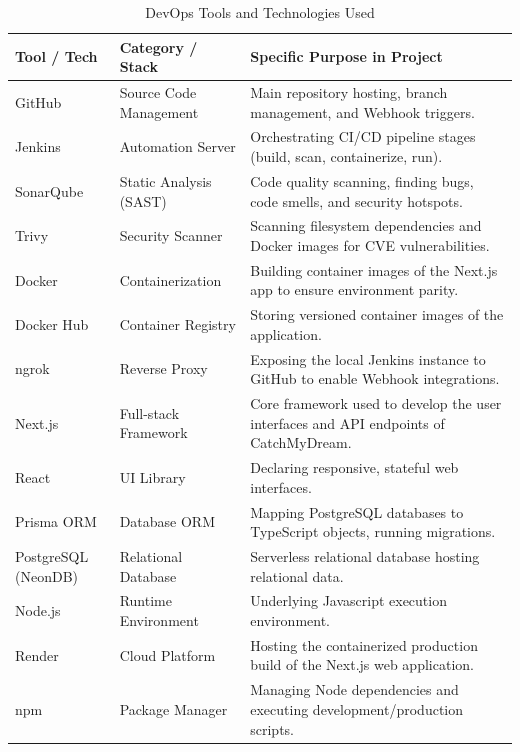 \documentclass[12pt,a4paper]{article}
\begin{document}
\begin{table}[H]
\centering
\caption{DevOps Tools and Technologies Used}
\label{tab:tools}
\vspace{0.2cm}
\begin{singlespace}
\small
\renewcommand{\arraystretch}{1.15} %
\begin{tabularx}{\textwidth}{p{3.2cm} >{\raggedright\arraybackslash}X >{\raggedright\arraybackslash}X}
\toprule
\rowcolor{gray!20} %
\textbf{Tool / Tech} & \textbf{Category / Stack} & \textbf{Specific Purpose in Project} \\
\midrule
GitHub & Source Code Management & Main repository hosting, branch management, and Webhook triggers. \\
Jenkins & Automation Server & Orchestrating CI/CD pipeline stages (build, scan, containerize, run). \\
SonarQube & Static Analysis (SAST) & Code quality scanning, finding bugs, code smells, and security hotspots. \\
Trivy & Security Scanner & Scanning filesystem dependencies and Docker images for CVE vulnerabilities. \\
Docker & Containerization & Building container images of the Next.js app to ensure environment parity. \\
Docker Hub & Container Registry & Storing versioned container images of the application. \\
ngrok & Reverse Proxy & Exposing the local Jenkins instance to GitHub to enable Webhook integrations. \\
Next.js & Full-stack Framework & Core framework used to develop the user interfaces and API endpoints of CatchMyDream. \\
React & UI Library & Declaring responsive, stateful web interfaces. \\
Prisma ORM & Database ORM & Mapping PostgreSQL databases to TypeScript objects, running migrations. \\
PostgreSQL (NeonDB) & Relational Database & Serverless relational database hosting relational data. \\
Node.js & Runtime Environment & Underlying Javascript execution environment. \\
Render & Cloud Platform & Hosting the containerized production build of the Next.js web application. \\
npm & Package Manager & Managing Node dependencies and executing development/production scripts. \\
\bottomrule
\end{tabularx}
\end{singlespace}
\end{table}
\end{document}
